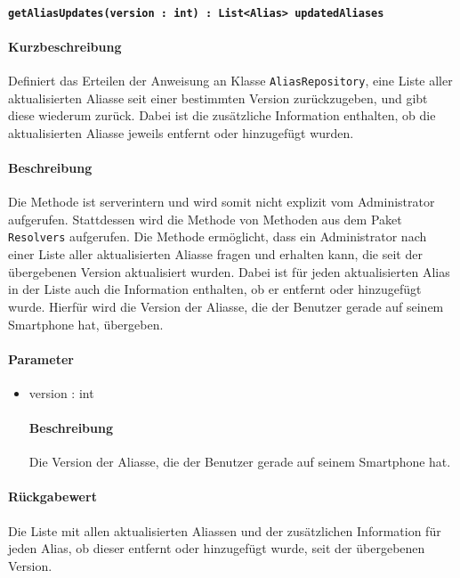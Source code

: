 \paragraph{\texttt{getAliasUpdates(version : int) : List<Alias> updatedAliases}}%
\paragraph*{Kurzbeschreibung}
Definiert das Erteilen der Anweisung an Klasse \texttt{AliasRepository}, eine Liste aller aktualisierten Aliasse seit einer bestimmten Version zurückzugeben, und gibt diese wiederum zurück. Dabei ist die zusätzliche Information enthalten, ob die aktualisierten Aliasse jeweils entfernt oder hinzugefügt wurden.
\paragraph*{Beschreibung}
Die Methode ist serverintern und wird somit nicht explizit vom Administrator aufgerufen.
Stattdessen wird die Methode von Methoden aus dem Paket \texttt{Resolvers} aufgerufen.
Die Methode ermöglicht, dass ein Administrator nach einer Liste aller aktualisierten Aliasse fragen und erhalten kann, die seit der übergebenen Version aktualisiert wurden.
Dabei ist für jeden aktualisierten Alias in der Liste auch die Information enthalten, ob er entfernt oder hinzugefügt wurde.
Hierfür wird die Version der Aliasse, die der Benutzer gerade auf seinem Smartphone hat, übergeben.
\paragraph*{Parameter}
\begin{itemize}
    \item version : int
    		\paragraph*{Beschreibung}
    		Die Version der Aliasse, die der Benutzer gerade auf seinem Smartphone hat.
\end{itemize}
\paragraph*{Rückgabewert}
Die Liste mit allen aktualisierten Aliassen und der zusätzlichen Information für jeden Alias, ob dieser entfernt oder hinzugefügt wurde, seit der übergebenen Version.
